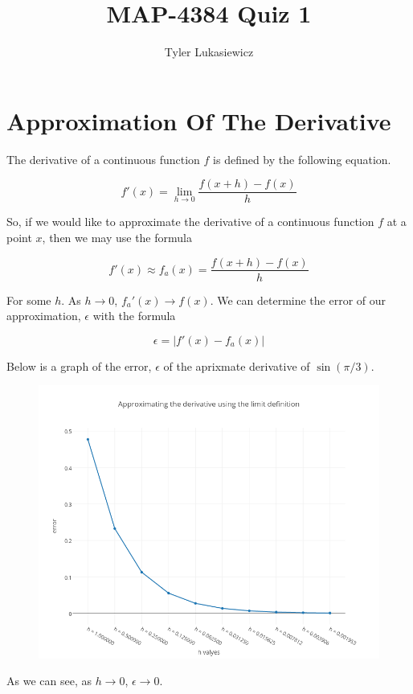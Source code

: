 \documentclass{article}
\title{MAP-4384 Quiz 1}
\author{Tyler Lukasiewicz }
\begin{document}
\maketitle

    \section{Approximation Of The Derivative}
    The derivative of a continuous function $f$ is defined by the following equation. 

    \begin{equation}
        f'(x) = \lim _ {h \to 0 } \frac{f(x+h) - f(x)}{h} 
    \end{equation}

    So, if we would like to approximate the derivative of a continuous function $f$ at a point $x$, then we may use the formula

    \begin{equation}
        f'(x) \approx  f_a(x) = \frac{f(x+h) - f(x)}{h} 
    \end{equation}

    For some $h$. As $h \to 0$, $f_a'(x) \to f(x)$. We can determine the error of our approximation,  $\epsilon$ with the formula 

    \begin{equation}
        \epsilon = |f'(x) - f_a(x)|
    \end{equation}

    Below is a graph of the error, $\epsilon$ of the  aprixmate derivative of $\sin (\pi / 3)$.

    \begin{figure}[!ht]
       \begin{center}
           \includegraphics[scale=.50]{graph}
       \end{center}
        \label{fig:1}
    \end{figure}

    As we can see, as $h \to 0$, $\epsilon \to 0$.
\end{document}
